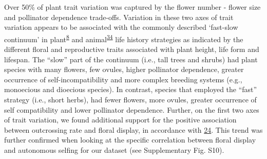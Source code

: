 \documentclass[12pt,a4paper,]{article}
\begin{document}
Over 50\% of plant trait variation was captured by the flower number -
flower size and pollinator dependence trade-offs. Variation in these two
axes of trait variation appears to be associated with the commonly
described `fast-slow continuum' in
plant\textsuperscript{\protect\hyperlink{ref-salguero2016}{8}} and
animal\textsuperscript{\protect\hyperlink{ref-healy2019}{34}} life
history strategies as indicated by the different floral and reproductive
traits associated with plant height, life form and lifespan. The
``slow'' part of the continuum (i.e., tall trees and shrubs) had plant
species with many flowers, few ovules, higher pollinator dependence,
greater occurrence of self-incompatibility and more complex breeding
systems (e.g., monoecious and dioecious species). In contrast, species
that employed the ``fast'' strategy (i.e., short herbs), had fewer
flowers, more ovules, greater occurrence of self compatibility and lower
pollinator dependence. Further, on the first two axes of trait
variation, we found additional support for the positive association
between outcrossing rate and floral display, in accordance with
\protect\hyperlink{ref-goodwillie2010}{24}. This trend was further
confirmed when looking at the specific correlation between floral
display and autonomous selfing for our dataset (see Supplementary Fig.
S10).
\end{document}
